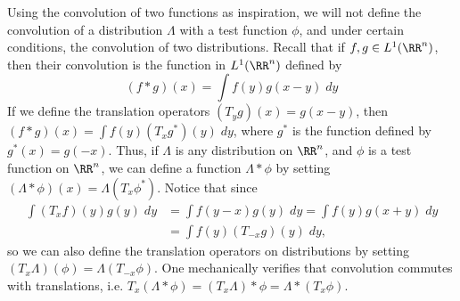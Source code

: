 Using the convolution of two functions as inspiration, we will not define the convolution of a distribution $\Lambda$ with a test function $\phi$, and under certain conditions, the convolution of two distributions. Recall that if $f,g \in L^1(\RR^n)$, then their convolution is the function in $L^1(\RR^n)$ defined by
%
\[ (f * g)(x) = \int f(y) g(x - y)\; dy \]
%
If we define the translation operators $(T_y g)(x) = g(x-y)$, then $(f * g)(x) = \int f(y) (T_x g^*)(y)\; dy$, where $g^*$ is the function defined by $g^*(x) = g(-x)$. Thus, if $\Lambda$ is any distribution on $\RR^n$, and $\phi$ is a test function on $\RR^n$, we can define a function $\Lambda * \phi$ by setting $(\Lambda * \phi)(x) = \Lambda(T_x \phi^*)$. Notice that since
%
\begin{align*}
    \int (T_x f)(y) g(y)\; dy &= \int f(y-x) g(y)\; dy = \int f(y) g(x+y)\; dy\\
    &= \int f(y) (T_{-x}g)(y)\; dy,
\end{align*}
%
so we can also define the translation operators on distributions by setting $(T_x \Lambda)(\phi) = \Lambda (T_{-x} \phi)$. One mechanically verifies that convolution commutes with translations, i.e. $T_x (\Lambda * \phi) = (T_x \Lambda) * \phi = \Lambda * (T_x \phi)$.

